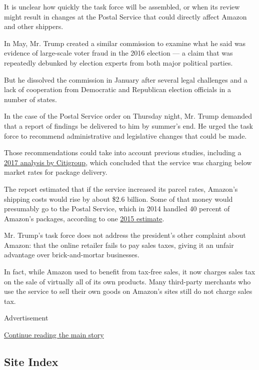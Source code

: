 It is unclear how quickly the task force will be assembled, or when its
review might result in changes at the Postal Service that could directly
affect Amazon and other shippers.

In May, Mr. Trump created a similar commission to examine what he said
was evidence of large-scale voter fraud in the 2016 election --- a claim
that was repeatedly debunked by election experts from both major
political parties.

But he dissolved the commission in January after several legal
challenges and a lack of cooperation from Democratic and Republican
election officials in a number of states.

In the case of the Postal Service order on Thursday night, Mr. Trump
demanded that a report of findings be delivered to him by summer's end.
He urged the task force to recommend administrative and legislative
changes that could be made.

Those recommendations could take into account previous studies,
including a
\href{https://ir.citi.com/XInLvxkr5F\%2FJvyPr1NMl\%2FPcIgrn\%2BXqplW8cqbv2ImZxLKrWAiRT\%2BcFMjQe6C\%2BuQT9n1mvCnznGU\%3D}{2017
analysis by Citigroup}, which concluded that the service was charging
below market rates for package delivery.

The report estimated that if the service increased its parcel rates,
Amazon's shipping costs would rise by about \$2.6 billion. Some of that
money would presumably go to the Postal Service, which in 2014 handled
40 percent of Amazon's packages, according to one
\href{https://www.bloomberg.com/news/articles/2017-12-29/trump-says-u-s-post-office-should-charge-amazon-much-more}{2015
estimate}.

Mr. Trump's task force does not address the president's other complaint
about Amazon: that the online retailer fails to pay sales taxes, giving
it an unfair advantage over brick-and-mortar businesses.

In fact, while Amazon used to benefit from tax-free sales, it now
charges sales tax on the sale of virtually all of its own products. Many
third-party merchants who use the service to sell their own goods on
Amazon's sites still do not charge sales tax.

Advertisement

\protect\hyperlink{after-bottom}{Continue reading the main story}

\hypertarget{site-index}{%
\subsection{Site Index}\label{site-index}}

